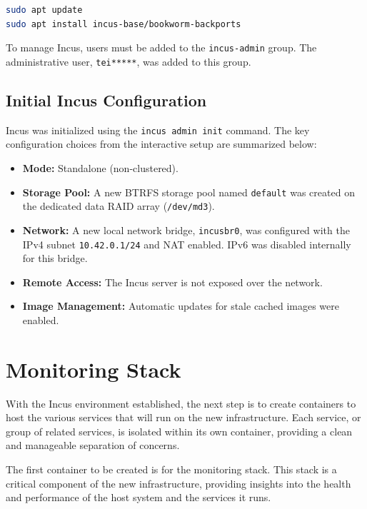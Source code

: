 \begin{lstlisting}[language=bash,caption={Commands to install the Incus server from Debian backports}]
sudo apt update
sudo apt install incus-base/bookworm-backports
\end{lstlisting}

To manage Incus, users must be added to the \texttt{incus-admin} group. The administrative user, \texttt{tei*****}, was added to this group.

\subsection*{Initial Incus Configuration}

Incus was initialized using the \texttt{incus admin init} command. The key configuration choices from the interactive setup are summarized below:
\begin{itemize}
    \item \textbf{Mode:} Standalone (non-clustered).
    \item \textbf{Storage Pool:} A new BTRFS storage pool named \texttt{default} was created on the dedicated data RAID array (\texttt{/dev/md3}).
    \item \textbf{Network:} A new local network bridge, \texttt{incusbr0}, was configured with the IPv4 subnet \texttt{10.42.0.1/24} and NAT enabled. IPv6 was disabled internally for this bridge.
    \item \textbf{Remote Access:} The Incus server is not exposed over the network.
    \item \textbf{Image Management:} Automatic updates for stale cached images were enabled.
\end{itemize}

\section{Monitoring Stack}

With the Incus environment established, the next step is to create containers to host the various services that will run on the new infrastructure. Each service, or group of related services, is isolated within its own container, providing a clean and manageable separation of concerns.

The first container to be created is for the monitoring stack. This stack is a critical component of the new infrastructure, providing insights into the health and performance of the host system and the services it runs.

